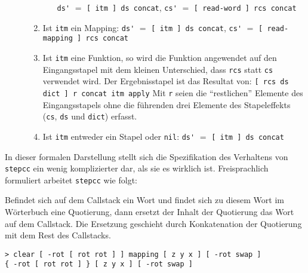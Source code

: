 \begin{description}
\begin{enumerate}
\begin{enumerate}
    \newline\verb|ds'| $=$ \verb|[ itm ] ds concat|,
    \newline\verb|cs'| $=$ \verb|[ read-word ] rcs concat|
  \end{enumerate}
\item Ist \verb|itm| ein Mapping:
  \newline\verb|ds'| $=$ \verb|[ itm ] ds concat|,
  \newline\verb|cs'| $=$ \verb|[ read-mapping ] rcs concat|
\item Ist \verb|itm| eine Funktion, \label{stepcc:fct}
  so wird die Funktion angewendet auf den Eingangsstapel mit dem
  kleinen Unterschied, dass \verb|rcs| statt \verb|cs| verwendet wird.
  Der Ergebnisstapel ist das Resultat von: 
  \newline\verb|[ rcs ds dict ] r concat itm apply|
  \newline Mit \verb|r| seien die "`restlichen"' Elemente des 
  Eingangsstapels ohne die führenden drei Elemente des Stapeleffekts
  (\verb|cs|, \verb|ds| und \verb|dict|) erfasst.
\item Ist \verb|itm| entweder ein Stapel oder \verb|nil|:
  \newline\verb|ds'| $=$ \verb|[ itm ] ds concat|
\end{enumerate}
\end{description}
% 

In dieser formalen Darstellung stellt sich die Spezifikation des Verhaltens von \verb|stepcc| ein wenig komplizierter dar, als sie es wirklich ist. Freisprachlich formuliert arbeitet \verb|stepcc| wie folgt:

Befindet sich auf dem Callstack ein Wort und findet sich zu diesem Wort im Wör\-ter\-buch eine Quotierung, dann ersetzt der Inhalt der Quotierung das Wort auf dem Callstack. Die Ersetzung geschieht durch Konkatenation der Quotierung mit dem Rest des Callstacks.

\begin{verbatim}
> clear [ -rot [ rot rot ] ] mapping [ z y x ] [ -rot swap ]
{ -rot [ rot rot ] } [ z y x ] [ -rot swap ]
\end{verbatim}

